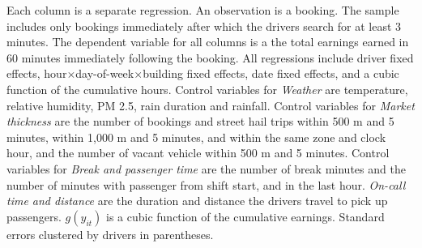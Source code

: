 \documentclass[reviewmode,AEJ]{AEA}
\begin{document}
\begin{table}[]
\begin{tablenotes}
		Each column is a separate regression. An observation is a booking. The sample includes only bookings immediately after which the drivers search for at least 3 minutes. The dependent variable for all columns is a the total earnings earned in 60 minutes immediately following the booking. All regressions include driver fixed effects, hour\(\times\)day-of-week\(\times\)building fixed effects, date fixed effects, and a cubic function of the cumulative hours. Control variables for \textit{Weather} are temperature, relative humidity, PM 2.5, rain duration and rainfall. Control variables for \textit{Market thickness} are the number of bookings and street hail trips within 500 m and 5 minutes, within 1,000 m and 5 minutes, and within the same zone and clock hour, and the number of vacant vehicle within 500 m and 5 minutes. Control variables for \textit{Break and passenger time} are the number of break minutes and the number of minutes with passenger from shift start, and in the last hour. \textit{On-call time and distance} are the duration and distance the drivers travel to pick up passengers. \(g(y_{it})\) is a cubic function of the cumulative earnings. Standard errors clustered by drivers in parentheses.%
	\end{tablenotes}
\end{table}
\end{document}
